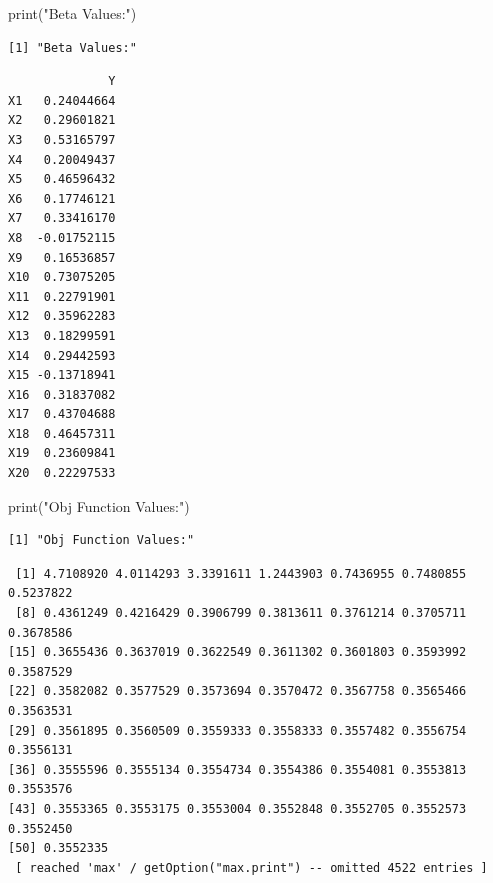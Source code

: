 \documentclass[
  letterpaper,
  DIV=11,
  numbers=noendperiod]{scrartcl}
\newenvironment{Shaded}{\begin{snugshade}}{\end{snugshade}}
\newcommand{\FunctionTok}[1]{\textcolor[rgb]{0.28,0.35,0.67}{#1}}
\newcommand{\NormalTok}[1]{\textcolor[rgb]{0.00,0.23,0.31}{#1}}
\newcommand{\SpecialCharTok}[1]{\textcolor[rgb]{0.37,0.37,0.37}{#1}}
\newcommand{\StringTok}[1]{\textcolor[rgb]{0.13,0.47,0.30}{#1}}
\begin{document}
\begin{Shaded}
\begin{Highlighting}[]
\FunctionTok{print}\NormalTok{(}\StringTok{"Beta Values:"}\NormalTok{)}
\end{Highlighting}
\end{Shaded}

\begin{verbatim}
[1] "Beta Values:"
\end{verbatim}

\begin{Shaded}
\end{Shaded}

\begin{verbatim}
              Y
X1   0.24044664
X2   0.29601821
X3   0.53165797
X4   0.20049437
X5   0.46596432
X6   0.17746121
X7   0.33416170
X8  -0.01752115
X9   0.16536857
X10  0.73075205
X11  0.22791901
X12  0.35962283
X13  0.18299591
X14  0.29442593
X15 -0.13718941
X16  0.31837082
X17  0.43704688
X18  0.46457311
X19  0.23609841
X20  0.22297533
\end{verbatim}

\begin{Shaded}
\begin{Highlighting}[]
\FunctionTok{print}\NormalTok{(}\StringTok{"Obj Function Values:"}\NormalTok{)}
\end{Highlighting}
\end{Shaded}

\begin{verbatim}
[1] "Obj Function Values:"
\end{verbatim}

\begin{Shaded}
\end{Shaded}

\begin{verbatim}
 [1] 4.7108920 4.0114293 3.3391611 1.2443903 0.7436955 0.7480855 0.5237822
 [8] 0.4361249 0.4216429 0.3906799 0.3813611 0.3761214 0.3705711 0.3678586
[15] 0.3655436 0.3637019 0.3622549 0.3611302 0.3601803 0.3593992 0.3587529
[22] 0.3582082 0.3577529 0.3573694 0.3570472 0.3567758 0.3565466 0.3563531
[29] 0.3561895 0.3560509 0.3559333 0.3558333 0.3557482 0.3556754 0.3556131
[36] 0.3555596 0.3555134 0.3554734 0.3554386 0.3554081 0.3553813 0.3553576
[43] 0.3553365 0.3553175 0.3553004 0.3552848 0.3552705 0.3552573 0.3552450
[50] 0.3552335
 [ reached 'max' / getOption("max.print") -- omitted 4522 entries ]
\end{verbatim}
\end{document}
